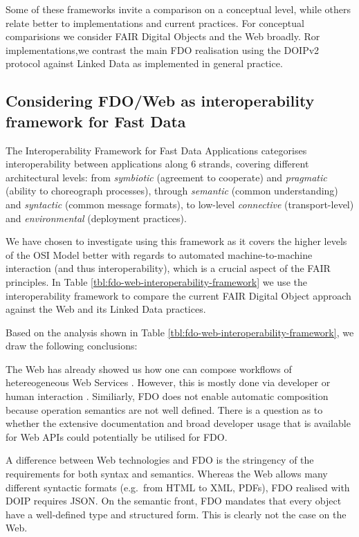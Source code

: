 \documentclass[fleqn,10pt,NOlineno]{wlpeerjlua}
\begin{document}
Some of these frameworks invite a comparison on a conceptual level, while others relate better to implementations and current practices. For conceptual comparisions we consider FAIR Digital Objects and the Web broadly. Ror implementations,we contrast the main FDO realisation using the DOIPv2 protocol \autocite{foundationDigitalObjectInterface} against Linked Data as implemented in general practice.


\subsection*{Considering FDO/Web as interoperability framework for Fast Data}\label{sec:interoperability-compare}

The Interoperability Framework for Fast Data Applications \autocite{delgadoInteroperabilityFrameworkDistributed2016a} categorises interoperability between applications along 6 strands, covering different architectural levels: from \emph{symbiotic} (agreement to cooperate) and \emph{pragmatic} (ability to choreograph processes), through \emph{semantic} (common understanding) and \emph{syntactic} (common message formats), to low-level \emph{connective} (transport-level) and \emph{environmental} (deployment practices).

We have chosen to investigate using this framework as it covers the higher levels of the OSI Model \autocite{stallingsHandbookComputercommunicationsStandards1990} better with regards to automated machine-to-machine interaction (and thus interoperability), which is a crucial aspect of the FAIR principles. In Table \vref{tbl:fdo-web-interoperability-framework} we use the interoperability framework to compare the current FAIR Digital Object approach against the Web and its Linked Data practices.

Based on the analysis shown in Table \ref{tbl:fdo-web-interoperability-framework}, we draw the following conclusions:

The Web has already showed us how one can compose workflows of hetereogeneous Web Services \autocite{wolstencroftTavernaWorkflowSuite2013d}. However, this is mostly done via developer or human interaction \autocite{lamprechtPerspectivesAutomatedComposition2021b}. Similiarly, FDO does not enable automatic composition because operation semantics are not well defined. There is a question as to whether the extensive documentation and broad developer usage that is available for Web APIs could potentially be utilised for FDO.

A difference between Web technologies and FDO is the stringency of the requirements for both syntax and semantics. Whereas the Web allows many different syntactic formats (e.g.~from HTML to XML, PDFs), FDO realised with DOIP requires JSON. On the semantic front, FDO mandates that every object have a well-defined type and structured form. This is clearly not the case on the Web.
\end{document}
